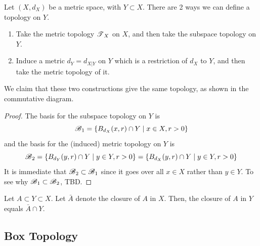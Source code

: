   \begin{theorem}
    Let $(X, d_X)$ be a metric space, with $Y \subset X$. There are 2 ways we can define a topology on $Y$. 
    \begin{enumerate}
      \item Take the metric topology $\T_X$ on $X$, and then take the subspace topology on $Y$. 
      \item Induce a metric $d_Y = d_{X | Y}$ on $Y$ which is a restriction of $d_X$ to $Y$, and then take the metric topology of it. 
    \end{enumerate}
    We claim that these two constructions give the same topology, as shown in the commutative diagram. 

    \begin{figure}[H]
      \centering 
      \caption{} 
      \label{fig:same_construction}
    \end{figure}
  \end{theorem}
  \begin{proof}
    The basis for the subspace topology on $Y$ is 
    \begin{equation}
      \B_1 = \{B_{d_X} (x, r) \cap Y \mid x \in X, r > 0 \}
    \end{equation} 
    and the basis for the (induced) metric topology on $Y$ is 
    \begin{equation}
      \B_2 = \{B_{d_Y} (y, r) \cap Y \mid y \in Y, r > 0 \} = \{B_{d_X} (y, r) \cap Y \mid y \in Y, r > 0 \}
    \end{equation} 
    It is immediate that $\B_2 \subset \B_1$ since it goes over all $x \in X$ rather than $y \in Y$. To see why $\B_1 \subset \B_2$, TBD. 
  \end{proof}

  \begin{theorem}
    Let $A \subset Y \subset X$. Let $\bar{A}$ denote the closure of $A$ in $X$. Then, the closure of $A$ in $Y$ equals $\bar{A} \cap Y$. 
  \end{theorem}

\subsection{Box Topology} 

